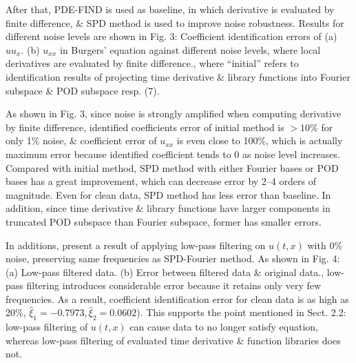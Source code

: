 \documentclass{article}
\begin{document}
\begin{itemize}
\begin{itemize}
		After that, PDE-FIND is used as baseline, in which derivative is evaluated by finite difference, \& SPD method is used to improve noise robustness. Results for different noise levels are shown in {\sf Fig. 3: Coefficient identification errors of (a) $uu_x$. (b) $u_{xx}$ in Burgers' equation against different noise levels, where local derivatives are evaluated by finite difference.}, where ``initial'' refers to identification results of projecting time derivative \& library functions into Fourier subspace \& POD subspace resp. (7).
		
		As shown in Fig. 3, since noise is strongly amplified when computing derivative by finite difference, identified coefficients error of initial method is $> 10\%$ for only 1\% noise, \& coefficient error of $u_{xx}$ is even close to 100\%, which is actually maximum error because identified coefficient tends to 0 as noise level increases. Compared with initial method, SPD method with either Fourier bases or POD bases has a great improvement, which can decrease error by 2--4 orders of magnitude. Even for clean data, SPD method has less error than baseline. In addition, since time derivative \& library functions have larger components in truncated POD subspace than Fourier subspace, former has smaller errors.
		
		In additions, present a result of applying low-pass filtering on $u(t,x)$ with 0\% noise, preserving same frequencies as SPD-Fourier method. As shown in {\sf Fig. 4: (a) Low-pass filtered data. (b) Error between filtered data \& original data.}, low-pass filtering introduces considerable error because it retains only very few frequencies. As a result, coefficient identification error for clean data is as high as 20\%, $\hat{\xi}_1 = -0.7973,\hat{\xi}_2 = 0.0602$). This supports the point mentioned in Sect. 2.2: low-pass filtering of $u(t,x)$ can cause data to no longer satisfy equation, whereas low-pass filtering of evaluated time derivative \& function libraries does not.
		

\end{itemize}
\end{itemize}
\end{document}
